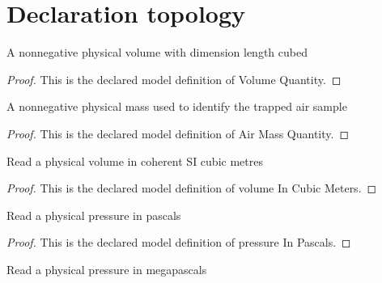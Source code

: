 \section{Declaration topology}
\begin{definition}
  \label{def:physics:phyx-mini-0401:phyxminiproblems-problemphyxmini0401-volumequantity}
  A nonnegative physical volume with dimension length cubed
\end{definition}
\begin{proof}
  This is the declared model definition of Volume Quantity.
\end{proof}
\begin{definition}
  \label{def:physics:phyx-mini-0401:phyxminiproblems-problemphyxmini0401-airmassquantity}
  A nonnegative physical mass used to identify the trapped air sample
\end{definition}
\begin{proof}
  This is the declared model definition of Air Mass Quantity.
\end{proof}
\begin{definition}
  \label{def:physics:phyx-mini-0401:phyxminiproblems-problemphyxmini0401-volumeincubicmeters}
  Read a physical volume in coherent SI cubic metres
\end{definition}
\begin{proof}
  This is the declared model definition of volume In Cubic Meters.
\end{proof}
\begin{definition}
  \label{def:physics:phyx-mini-0401:phyxminiproblems-problemphyxmini0401-pressureinpascals}
  Read a physical pressure in pascals
\end{definition}
\begin{proof}
  This is the declared model definition of pressure In Pascals.
\end{proof}
\begin{definition}
  \label{def:physics:phyx-mini-0401:phyxminiproblems-problemphyxmini0401-pressureinmegapascals}
  Read a physical pressure in megapascals
\end{definition}
